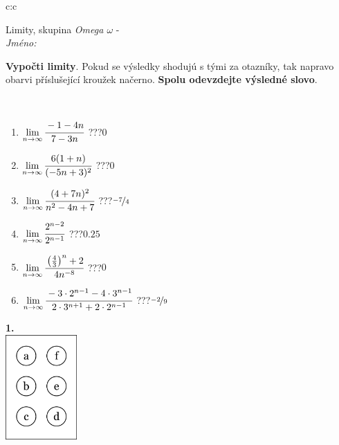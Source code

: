 \documentclass[10pt]{report}
\begin{document}
\begin{tabular}{c:c}
\begin{minipage}[c][104.5mm][t]{0.5\linewidth}
\begin{center}
\vspace{7mm}
{\huge Limity, skupina \textit{Omega $\omega$} -}\\[5mm]
\textit{Jméno:}\phantom{xxxxxxxxxxxxxxxxxxxxxxxxxxxxxxxxxxxxxxxxxxxxxxxxxxxxxxxxxxxxxxxxx}\\[5mm]
\begin{minipage}{0.95\linewidth}
\begin{center}
\textbf{Vypočti limity}. Pokud se výsledky shodujú s tými za otazníky, tak napravo\\obarvi příslušející kroužek načerno. \textbf{Spolu odevzdejte výsledné slovo}.
\end{center}
\end{minipage}
\\[1mm]
\begin{minipage}{0.79\linewidth}
\begin{center}
\begin{varwidth}{\linewidth}
\begin{enumerate}
\normalsize
\item $\lim\limits_{n\to\infty}\cfrac{-1-4n}{7-3n}$\quad \dotfill\; ???\;\dotfill \quad $0$
\item $\lim\limits_{n\to\infty}\cfrac{6(1+n)}{(-5n+3)^2}$\quad \dotfill\; ???\;\dotfill \quad $0$
\item $\lim\limits_{n\to\infty}\cfrac{(4+7n)^2}{n^2-4n+7}$\quad \dotfill\; ???\;\dotfill \quad $\nicefrac{-7}{4}$
\item $\lim\limits_{n\to\infty}\cfrac{2^{n-2}}{2^{n-1}}$\quad \dotfill\; ???\;\dotfill \quad $0.25$
\item $\lim\limits_{n\to\infty}\cfrac{\left(\frac{4}{3}\right)^n +2}{4n^{-8}}$\quad \dotfill\; ???\;\dotfill \quad $0$
\item $\lim\limits_{n\to\infty}\cfrac{-3\cdot 2^{n-1}-4\cdot 3^{n-1}}{2\cdot 3^{n+1}+2\cdot 2^{n-1}}$\quad \dotfill\; ???\;\dotfill \quad $\nicefrac{-2}{9}$
\end{enumerate}
\end{varwidth}
\end{center}
\end{minipage}
\begin{minipage}{0.20\linewidth}
\begin{center}
{\Huge\bfseries 1.} \\[2mm]
\includegraphics[height=40mm]{../images/braille.png}

\end{center}
\end{minipage}
\end{center}
\end{minipage}
\end{tabular}
\end{document}
